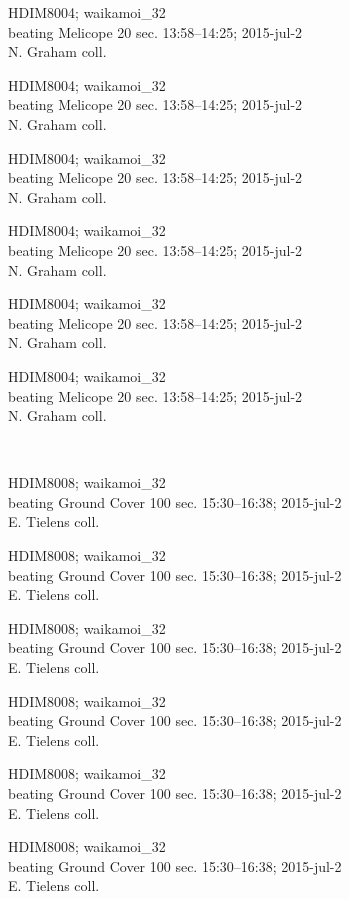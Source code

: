 \documentclass[2pt]{extarticle}
\begin{document}
\noindent
\parbox{0.16\textwidth}{\tiny \raggedright \rule[-0.3\baselineskip]{0pt}{10pt}HDIM8004; waikamoi\_32\\ beating Melicope 20 sec. 13:58--14:25; 2015-jul-2\\ N. Graham coll.}
\parbox{0.16\textwidth}{\tiny \raggedright \rule[-0.3\baselineskip]{0pt}{10pt}HDIM8004; waikamoi\_32\\ beating Melicope 20 sec. 13:58--14:25; 2015-jul-2\\ N. Graham coll.}
\parbox{0.16\textwidth}{\tiny \raggedright \rule[-0.3\baselineskip]{0pt}{10pt}HDIM8004; waikamoi\_32\\ beating Melicope 20 sec. 13:58--14:25; 2015-jul-2\\ N. Graham coll.}
\parbox{0.16\textwidth}{\tiny \raggedright \rule[-0.3\baselineskip]{0pt}{10pt}HDIM8004; waikamoi\_32\\ beating Melicope 20 sec. 13:58--14:25; 2015-jul-2\\ N. Graham coll.}
\parbox{0.16\textwidth}{\tiny \raggedright \rule[-0.3\baselineskip]{0pt}{10pt}HDIM8004; waikamoi\_32\\ beating Melicope 20 sec. 13:58--14:25; 2015-jul-2\\ N. Graham coll.}
\parbox{0.16\textwidth}{\tiny \raggedright \rule[-0.3\baselineskip]{0pt}{10pt}HDIM8004; waikamoi\_32\\ beating Melicope 20 sec. 13:58--14:25; 2015-jul-2\\ N. Graham coll.} \\ 
\vspace{0.001in} 

\noindent
\parbox{0.16\textwidth}{\tiny \raggedright \rule[-0.3\baselineskip]{0pt}{10pt}HDIM8008; waikamoi\_32\\ beating Ground Cover 100 sec. 15:30--16:38; 2015-jul-2\\ E. Tielens coll.}
\parbox{0.16\textwidth}{\tiny \raggedright \rule[-0.3\baselineskip]{0pt}{10pt}HDIM8008; waikamoi\_32\\ beating Ground Cover 100 sec. 15:30--16:38; 2015-jul-2\\ E. Tielens coll.}
\parbox{0.16\textwidth}{\tiny \raggedright \rule[-0.3\baselineskip]{0pt}{10pt}HDIM8008; waikamoi\_32\\ beating Ground Cover 100 sec. 15:30--16:38; 2015-jul-2\\ E. Tielens coll.}
\parbox{0.16\textwidth}{\tiny \raggedright \rule[-0.3\baselineskip]{0pt}{10pt}HDIM8008; waikamoi\_32\\ beating Ground Cover 100 sec. 15:30--16:38; 2015-jul-2\\ E. Tielens coll.}
\parbox{0.16\textwidth}{\tiny \raggedright \rule[-0.3\baselineskip]{0pt}{10pt}HDIM8008; waikamoi\_32\\ beating Ground Cover 100 sec. 15:30--16:38; 2015-jul-2\\ E. Tielens coll.}
\parbox{0.16\textwidth}{\tiny \raggedright \rule[-0.3\baselineskip]{0pt}{10pt}HDIM8008; waikamoi\_32\\ beating Ground Cover 100 sec. 15:30--16:38; 2015-jul-2\\ E. Tielens coll.} \\ 
\vspace{0.001in} 
\end{document}
